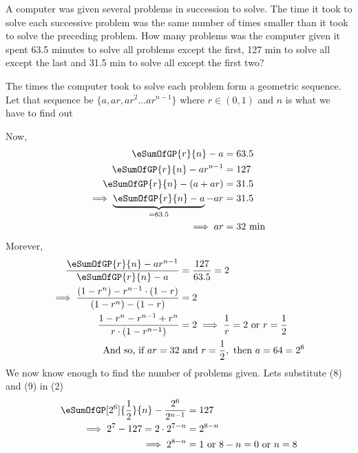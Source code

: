 

\question[5] A computer was given several problems in succession to solve. The time it took 
to solve each successive problem was the same number of times smaller than it took
to solve the preceding problem. How many problems was the computer given  it 
spent 63.5 minutes to solve all problems except the first, 127 min to solve all except
the last and 31.5 min to solve all except the first two?


\ifprintanswers
\fi 

\begin{solution}[\fullpage]
	The times the computer took to solve each problem form a geometric sequence. Let 
	that sequence be $\lbrace a, ar, ar^2 \ldots ar^{n-1}\rbrace$ where $r \in (0,1)$ and $n$
	is what we have to find out
	
	Now,
	\begin{align}
		\eSumOfGP{r}{n} - a &= 63.5 \\
		\eSumOfGP{r}{n} - ar^{n-1} &= 127 \\
		\eSumOfGP{r}{n} - (a + ar) &= 31.5 \\
		\implies \underbrace{\eSumOfGP{r}{n} - a}_{=63.5} - ar &= 31.5 \\
		\implies ar &= 32\text{ min }
	\end{align}
	Morever, 
	\begin{align}
		\dfrac{\eSumOfGP{r}{n} - ar^{n-1}}{\eSumOfGP{r}{n} - a} &= \frac{127}{63.5} = 2 \\
		\implies \dfrac{(1-r^n) - r^{n-1}\cdot(1-r)}{(1-r^n) - (1-r)} &= 2  \\
		\dfrac{1-r^n-r^{n-1}+r^n}{r\cdot(1-r^{n-1})} &= 2 \implies \dfrac{1}{r} = 2 
		\text{ or } r = \frac{1}{2} \\
		\text{And so, if } ar = 32 &\text{ and } r = \frac{1}{2}, \text{ then } a = 64 = 2^6
	\end{align}
	We now know enough to find the number of problems given. Lets substitute (8) and (9) in (2)
	\begin{align}
		\eSumOfGP[2^6]{\frac{1}{2}}{n}-\dfrac{2^6}{2^{n-1}} &= 127 \\
		\implies 2^7-127 = 2\cdot 2^{7-n} &= 2^{8-n} \\
		\implies 2^{8-n} &= 1 \text{ or } 8-n = 0 \text{ or } n = 8
	\end{align}
\end{solution}
\ifprintanswers\begin{codex}\end{codex}\fi
